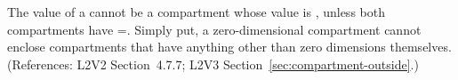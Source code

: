 The   value of a \Compartment cannot be a
compartment whose  value is ,
unless both compartments have =.
Simply put, a zero-dimensional compartment cannot enclose
compartments that have anything other than zero dimensions
themselves.  (References: L2V2 Section~4.7.7; L2V3
Section~\ref{sec:compartment-outside}.)
